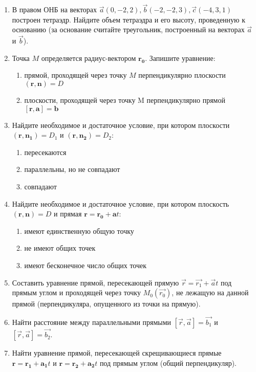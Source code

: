 \begin{enumerate}
	
	\item В правом ОНБ на векторах $\vec a (0, -2, 2), \vec b (-2, -2, 3), \vec c(-4, 3, 1)$ построен тетраэдр. Найдите объем тетраэдра и его высоту, проведенную к основанию (за основание считайте треугольник, построенный на векторах $\vec a$ и $\vec b$).

    \item Точка $M$ определяется радиус-вектором $\mathbf{r_0}$. Запишите уравнение:
        \begin{enumerate}
	        \item прямой, проходящей через точку $M$ перпендикулярно плоскости $(\mathbf{r}, \mathbf{n})=D$
	        \item плоскости, проходящей через точку M перпендикулярно прямой $[\mathbf{r}, \mathbf{a}]=\mathbf{b}$
	    \end{enumerate}

	\item Найдите необходимое и достаточное условие, при котором плоскости ${(\mathbf{r}, \mathbf{n_1}) = D_1}$ и ${(\mathbf{r}, \mathbf{n_2}) = D_2}$:
	    \begin{enumerate}
	        \item пересекаются
	        \item параллельны, но не совпадают
	        \item совпадают
	    \end{enumerate}
	 
	\item Найдите необходимое и достаточное условие, при котором плоскость $(\mathbf{r}, \mathbf{n}) = D$ и прямая $\mathbf{r}=\mathbf{r_0} + \mathbf{a}t$:
	    \begin{enumerate}
	        \item имеют единственную общую точку
	        \item не имеют общих точек
	        \item имеют бесконечное число общих точек
	    \end{enumerate}
	

	\item Составить уравнение прямой, пересекающей прямую $\vec{r} = \vec{r_1} + \vec{a} t$ под прямым углом и проходящей через точку $M_0(\vec{r_0})$,  не лежащую на данной прямой (перпендикуляра, опущенного из точки на прямую).
	\item Найти расстояние между параллельными прямыми $[\vec{r}, \vec a] = \vec{b_1}$ и $[\vec{r}, \vec a] = \vec{b_2}$.
	

	\item Найти уравнение прямой, пересекающей скрещивающиеся прямые $\mathbf{r} = \mathbf{r_1} + \mathbf{a_1}t$ и $\mathbf{r} = \mathbf{r_2} + \mathbf{a_2}t$ под прямым углом (общий перпендикуляр).
   
   
\end{enumerate}